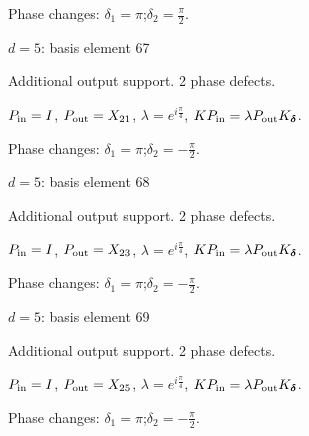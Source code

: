 \par\smallskip\begin{minipage}{.98\linewidth}\small Phase changes: $\delta_{1}=\pi$;\quad $\delta_{2}=\frac{\pi}{2}$.\end{minipage}
\vfill
{\footnotesize\texttt{}}
\newpage
{}
{\Large $d=5$: basis element 67}\par
Additional output support. 2 phase defects.
\begin{center}
\end{center}
\vspace{-1mm}
$P_{\rm in}=I$, \quad $P_{\rm out}=X_{21}$, \quad $\lambda=e^{i\frac{\pi}{4}}$, \qquad $K P_{\rm in}=\lambda P_{\rm out}K_{\boldsymbol\delta}$.
\par\smallskip\begin{minipage}{.98\linewidth}\small Phase changes: $\delta_{1}=\pi$;\quad $\delta_{2}=-\frac{\pi}{2}$.\end{minipage}
\vfill
{\footnotesize\texttt{}}
\newpage
{}
{\Large $d=5$: basis element 68}\par
Additional output support. 2 phase defects.
\begin{center}
\end{center}
\vspace{-1mm}
$P_{\rm in}=I$, \quad $P_{\rm out}=X_{23}$, \quad $\lambda=e^{i\frac{\pi}{4}}$, \qquad $K P_{\rm in}=\lambda P_{\rm out}K_{\boldsymbol\delta}$.
\par\smallskip\begin{minipage}{.98\linewidth}\small Phase changes: $\delta_{1}=\pi$;\quad $\delta_{2}=-\frac{\pi}{2}$.\end{minipage}
\vfill
{\footnotesize\texttt{}}
\newpage
{}
{\Large $d=5$: basis element 69}\par
Additional output support. 2 phase defects.
\begin{center}
\end{center}
\vspace{-1mm}
$P_{\rm in}=I$, \quad $P_{\rm out}=X_{25}$, \quad $\lambda=e^{i\frac{\pi}{4}}$, \qquad $K P_{\rm in}=\lambda P_{\rm out}K_{\boldsymbol\delta}$.
\par\smallskip\begin{minipage}{.98\linewidth}\small Phase changes: $\delta_{1}=\pi$;\quad $\delta_{2}=-\frac{\pi}{2}$.\end{minipage}
